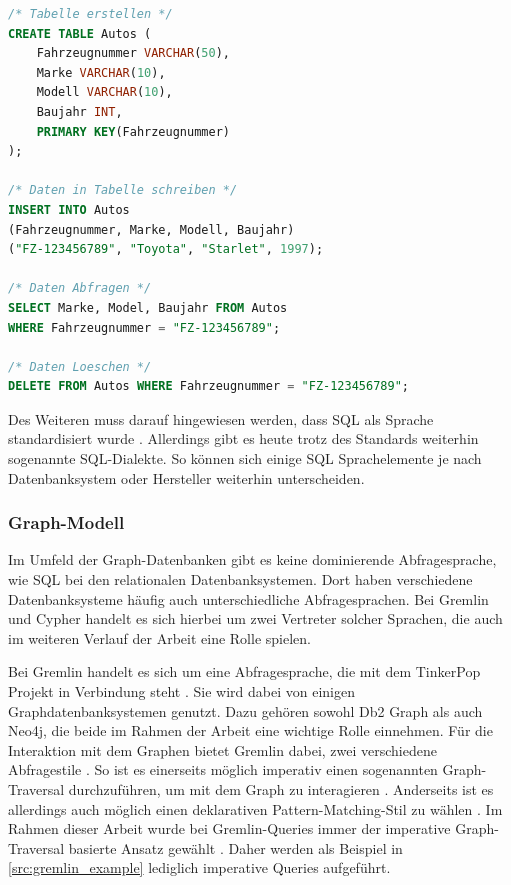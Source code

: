 \begin{lstlisting}[caption={Beispiel SQL-Queries},language=SQL,label=src:sql_example]
/* Tabelle erstellen */
CREATE TABLE Autos (
    Fahrzeugnummer VARCHAR(50), 
    Marke VARCHAR(10), 
    Modell VARCHAR(10), 
    Baujahr INT,
    PRIMARY KEY(Fahrzeugnummer)
);

/* Daten in Tabelle schreiben */
INSERT INTO Autos 
(Fahrzeugnummer, Marke, Modell, Baujahr) 
("FZ-123456789", "Toyota", "Starlet", 1997);

/* Daten Abfragen */
SELECT Marke, Model, Baujahr FROM Autos 
WHERE Fahrzeugnummer = "FZ-123456789";

/* Daten Loeschen */
DELETE FROM Autos WHERE Fahrzeugnummer = "FZ-123456789";
\end{lstlisting}

Des Weiteren muss darauf hingewiesen werden, dass SQL als Sprache standardisiert wurde \cite{sql_history}. Allerdings gibt es heute trotz des Standards weiterhin sogenannte SQL-Dialekte. So können sich einige SQL Sprachelemente je nach Datenbanksystem oder Hersteller weiterhin unterscheiden. 

\subsubsection{Graph-Modell}

Im Umfeld der Graph-Datenbanken gibt es keine dominierende Abfragesprache, wie SQL bei den relationalen Datenbanksystemen. Dort haben verschiedene Datenbanksysteme häufig auch unterschiedliche Abfragesprachen. Bei Gremlin und Cypher handelt es sich hierbei um zwei Vertreter solcher Sprachen, die auch im weiteren Verlauf der Arbeit eine Rolle spielen. 

Bei Gremlin handelt es sich um eine Abfragesprache, die mit dem TinkerPop Projekt in Verbindung steht \cite{tinkerpop_2020}. Sie wird dabei von einigen Graphdatenbanksystemen genutzt. Dazu gehören sowohl Db2 Graph als auch Neo4j, die beide im Rahmen der Arbeit eine wichtige Rolle einnehmen. Für die Interaktion mit dem Graphen bietet Gremlin dabei, zwei verschiedene Abfragestile \cite{gremlin_paper}. So ist es einerseits möglich imperativ einen sogenannten Graph-Traversal durchzuführen, um mit dem Graph zu interagieren \cite{gremlin_paper}. Anderseits ist es allerdings auch möglich einen deklarativen Pattern-Matching-Stil zu wählen \cite{gremlin_paper}. Im Rahmen dieser Arbeit wurde bei Gremlin-Queries immer der imperative Graph-Traversal basierte Ansatz gewählt \cite{gremlin_paper}. Daher werden als Beispiel in \autoref{src:gremlin_example} lediglich imperative Queries aufgeführt. 

